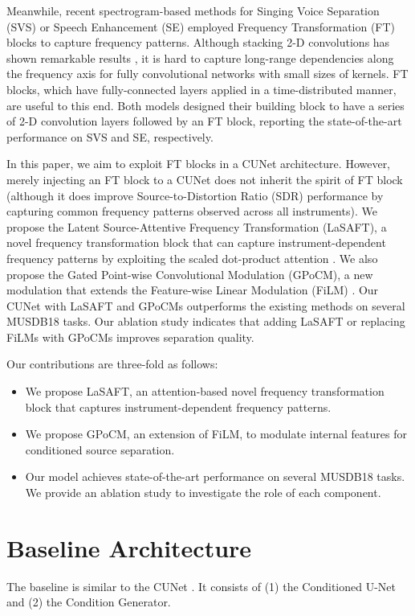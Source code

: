 \documentclass{article}
\begin{document}
Meanwhile, recent spectrogram-based methods for Singing Voice Separation (SVS) \cite{tfctdf} or Speech Enhancement (SE) \cite{phasen} employed Frequency Transformation (FT) blocks to capture frequency patterns. 
Although stacking 2-D convolutions has shown remarkable results \cite{svs_unet,mmdenselstm}, it is hard to capture long-range dependencies along the frequency axis for fully convolutional networks with small sizes of kernels. FT blocks, which have fully-connected layers applied in a time-distributed manner, are useful to this end.
Both models designed their building block to have a series of 2-D convolution layers followed by an FT block, reporting the state-of-the-art performance on SVS and SE, respectively.


In this paper, we aim to exploit FT blocks in a CUNet architecture.
However, merely injecting an FT block to a CUNet does not inherit the spirit of FT block (although it does improve Source-to-Distortion Ratio (SDR) \cite{bss} performance by capturing common frequency patterns observed across all instruments). 
We propose the Latent Source-Attentive Frequency Transformation (LaSAFT), a novel frequency transformation block that can capture instrument-dependent frequency patterns by exploiting the scaled dot-product attention \cite{transformer}.
We also propose the Gated Point-wise Convolutional Modulation (GPoCM), a new modulation that extends the Feature-wise Linear Modulation (FiLM) \cite{film}.
Our CUNet with LaSAFT and GPoCMs outperforms the existing methods on several MUSDB18 \cite{musdb18} tasks. Our ablation study indicates that adding LaSAFT or replacing FiLMs with GPoCMs improves separation quality.

Our contributions are three-fold as follows:

\begin{itemize}
    \item We propose LaSAFT, an attention-based novel frequency transformation block that captures instrument-dependent frequency patterns.
    \item We propose GPoCM, an extension of FiLM, to modulate internal features for conditioned source separation.
    \item Our model achieves state-of-the-art performance on several MUSDB18 tasks. We provide an ablation study to investigate the role of each component.
\end{itemize}



\section{Baseline Architecture}
\label{sec:baseline}
The baseline is similar to the CUNet \cite{cunet}. It consists of (1) the Conditioned U-Net and (2) the Condition Generator.
\end{document}
